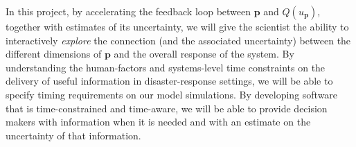 \documentclass[a4paper,fontsize=13pt]{scrartcl}
\begin{document}
In this project, by accelerating the feedback loop between $\mathbf{p}$ and
$Q(u_{\mathbf{p}})$, together with estimates of its uncertainty, we will give
the scientist the ability to interactively \emph{explore} the
connection (and the associated uncertainty) between the different
dimensions of $\mathbf{p}$ and the overall response of the system.
By understanding the human-factors and systems-level time constraints on the delivery of useful information in
disaster-response settings, we will be able to specify timing requirements on our model simulations.
By developing software that is time-constrained and time-aware, we will be able to provide decision makers
with information when it is needed and with an estimate on the uncertainty of that information. 

\end{document}
